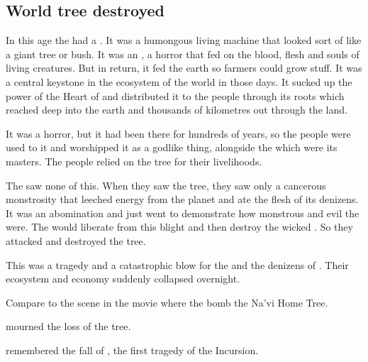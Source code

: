








\subsection{World tree destroyed}
In this age the \dragons had a . 
It was a humongous living machine that looked sort of like a giant tree or bush. 
It was an , a horror that fed on the blood, flesh and souls of living creatures. 
But in return, it fed the earth so farmers could grow stuff. 
It was a central keystone in the ecosystem of the world in those days. 
It sucked up the power of the Heart of \Miith and distributed it to the people through its roots which reached deep into the earth and thousands of kilometres out through the land. 

It was a horror, but it had been there for hundreds of years, so the people were used to it and worshipped it as a godlike thing, alongside the \dragons which were its masters. 
The people relied on the tree for their livelihoods. 

The \resphain saw none of this. 
When they saw the tree, they saw only a cancerous monstrosity that leeched energy from the planet and ate the flesh of its denizens. 
It was an abomination and just went to demonstrate how monstrous and evil the \dragons were. 
The \resphain would liberate \Miith from this blight and then destroy the wicked \dragons. 
So they attacked and destroyed the tree. 

This was a tragedy and a catastrophic blow for the \dragons and the denizens of \Tembrae.
Their ecosystem and economy suddenly collapsed overnight. 

Compare to the scene in the movie \cite{Movie:Avatar} where the \humans bomb the Na'vi Home Tree. 

\Rystessakhin mourned the loss of the tree. 


\Rystessakhin remembered the fall of \Nexagglachel, the first tragedy of the Incursion. 

